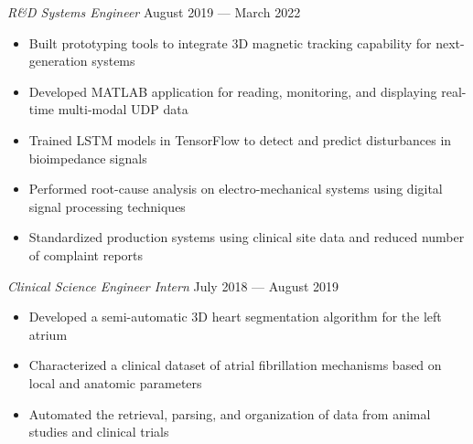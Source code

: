 \documentclass{article}
\begin{document}
\textit{R\&D Systems Engineer} \hfill August 2019 --- March 2022\\
\vspace{-2mm}
\begin{itemize} \itemsep 0.05pt
	\item Built prototyping tools to integrate 3D magnetic tracking capability for next-generation systems
	\item Developed MATLAB application for reading, monitoring, and displaying real-time multi-modal UDP data
	\item Trained LSTM models in TensorFlow to detect and predict disturbances in bioimpedance signals
	\item Performed root-cause analysis on electro-mechanical systems using digital signal processing techniques
	\item Standardized production systems using clinical site data and reduced number of complaint reports
\end{itemize}

\textit{Clinical Science Engineer Intern} \hfill July 2018 --- August 2019\\
\vspace{-2mm}
\begin{itemize} \itemsep 0.05pt
	\item Developed a semi-automatic 3D heart segmentation algorithm for the left atrium
	\item Characterized a clinical dataset of atrial fibrillation mechanisms based on local and anatomic parameters
	\item Automated the retrieval, parsing, and organization of data from animal studies and clinical trials
\end{itemize}

\end{document}
